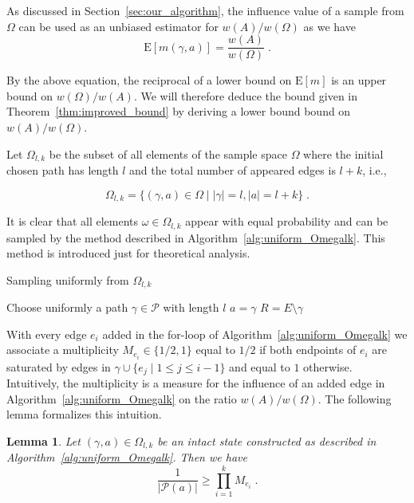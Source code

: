\documentclass{article}
\newtheorem{lemma}{Lemma}
\newcommand\ex{\mathrm{E}}
\begin{document}
As discussed in Section~\ref{sec:our_algorithm}, the influence
value of a sample from $\Omega$ can be used as an unbiased estimator for
$w(A)/w(\Omega)$ as we have
\begin{equation*}
\ex[m(\gamma,a)]=\frac{w(A)}{w(\Omega)}\;.
\end{equation*}

By the above equation, the reciprocal of a lower bound on $\ex[m]$
is an upper bound on $w(\Omega)/w(A)$. We will therefore
deduce the bound given in Theorem~\ref{thm:improved_bound} by
deriving a lower bound bound on $w(A)/w(\Omega)$.

Let $\Omega_{l,k}$ be the subset of all elements of the sample
space $\Omega$ where the initial chosen path has length $l$
and the total number of appeared edges is $l+k$, i.e.,

\begin{equation*}
\Omega_{l,k}=\{(\gamma,a)\in\Omega\mid |\gamma|=l, |a|=l+k\}\;.
\end{equation*}

It is clear that all elements $\omega \in \Omega_{l,k}$ appear with equal probability
and can be
sampled by the method described in Algorithm~\ref{alg:uniform_Omegalk}. This method is introduced just
for theoretical analysis.

\linesnumbered
\begin{algorithm}[H]
\SetLine
\caption{Sampling uniformly from $\Omega_{l,k}$\label{alg:uniform_Omegalk}}
Choose uniformly a path $\gamma\in\mathcal{P}$ with length $l$\;
$a=\gamma$\;
$R=E\setminus \gamma$\;
\end{algorithm}

With every edge $e_i$ added in the \mbox{for-loop} of
Algorithm~\ref{alg:uniform_Omegalk} we associate a multiplicity
$M_{e_i}\in\{1/2,1\}$ equal to $1/2$ if both endpoints of $e_i$
are saturated by edges in $\gamma \cup \{e_j\mid 1\leq j \leq i-1\}$
and equal to $1$ otherwise. Intuitively, the multiplicity
is a measure for the influence of an added
edge in Algorithm~\ref{alg:uniform_Omegalk} on the ratio
$w(A)/w(\Omega)$. The following lemma formalizes this
intuition.

\begin{lemma}\label{lem:multiplicity}
Let $(\gamma,a)\in \Omega_{l,k}$ be an intact state constructed as described in
Algorithm~\ref{alg:uniform_Omegalk}. Then we have
\begin{equation*}
\frac{1}{|\mathcal{P}(a)|}\geq \prod_{i=1}^k M_{e_i}\;.
\end{equation*}
\end{lemma}
\end{document}
